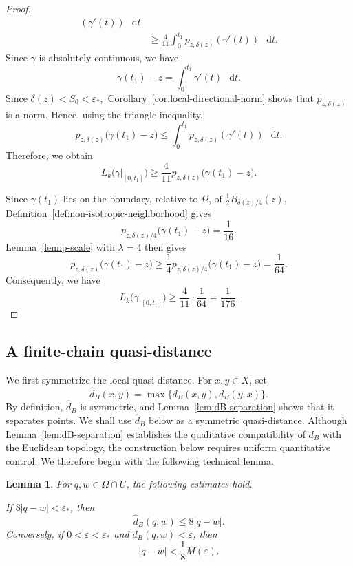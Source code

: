 \documentclass[11pt]{article}
\newtheorem{lemma}[theorem]{Lemma}
\theoremstyle{definition}
\newcommand{\eps}{\varepsilon}
\newcommand{\dd}{\mathop{}\!\mathrm{d}}
\begin{document}
\begin{proof}
\[\begin{aligned}
	(\gamma'(t))\,\dd t\\
	&\ge
	\frac4{11}
	\int_0^{t_1}
	p_{z,\delta(z)}(\gamma'(t))\,\dd t.
\end{aligned}
\]
Since \(\gamma\) is absolutely continuous, we have
\[
\gamma(t_1)-z
=
\int_0^{t_1}\gamma'(t)\,\dd t.
\]
Since
\(
\delta(z)<S_0<\eps_*,
\)
Corollary~\ref{cor:local-directional-norm} shows that
\(p_{z,\delta(z)}\) is a norm.  Hence, using the triangle inequality,
\[
p_{z,\delta(z)}\bigl(\gamma(t_1)-z\bigr)
\le
\int_0^{t_1}
p_{z,\delta(z)}(\gamma'(t))\,\dd t.
\]
Therefore, we obtain
\[
L_k\bigl(\gamma|_{[0,t_1]}\bigr)
\ge
\frac4{11}
p_{z,\delta(z)}\bigl(\gamma(t_1)-z\bigr).
\]





	
	Since \(\gamma(t_1)\) lies on the boundary, relative to \(\Omega\), of
	\(\frac12 B_{\delta(z)/4}(z)\),
	Definition~\ref{def:non-isotropic-neighborhood} gives
	\[
	p_{z,\delta(z)/4}\bigl(\gamma(t_1)-z\bigr)
	=
	\frac1{16}.
	\]
	Lemma~\ref{lem:p-scale} with \(\lambda=4\) then gives
	\[
	p_{z,\delta(z)}\bigl(\gamma(t_1)-z\bigr)
	\ge
	\frac14
	p_{z,\delta(z)/4}\bigl(\gamma(t_1)-z\bigr)
	=
	\frac1{64}.
	\]
	Consequently, we have
	\[
	L_k\bigl(\gamma|_{[0,t_1]}\bigr)
	\ge
	\frac4{11}\cdot\frac1{64}
	=
	\frac1{176}.
	\]
\end{proof}
\subsection{A finite-chain quasi-distance}
We first symmetrize the local quasi-distance.  For
\(x,y\in X\), set
\[
 \widehat d_B(x,y)
 =
 \max\{d_B(x,y),d_B(y,x)\}.
\]
By definition, \(\widehat d_B\) is symmetric, and
Lemma~\ref{lem:dB-separation} shows that it separates points. We shall
use \(\widehat d_B\) below as a symmetric quasi-distance. Although
Lemma~\ref{lem:dB-separation} establishes the qualitative compatibility
of \(d_B\) with the Euclidean topology, the construction below requires
uniform quantitative control. We therefore begin with the following
technical lemma.
\begin{lemma}\label{lem:dB-euclidean-control}
	For \(q,w\in\Omega\cap U\), the following estimates hold.
	
	If
	\(8|q-w|<\eps_*\),
	then
	\begin{equation*}
		\widehat d_B(q,w)
		\le
		8|q-w|.
	\end{equation*}
	Conversely, if \(0<\eps<\eps_*\) and
	\(d_B(q,w)<\eps\),
	then
	\begin{equation*}
		|q-w|
		<
		\frac18 M(\eps).
	\end{equation*}
\end{lemma}
\end{document}
